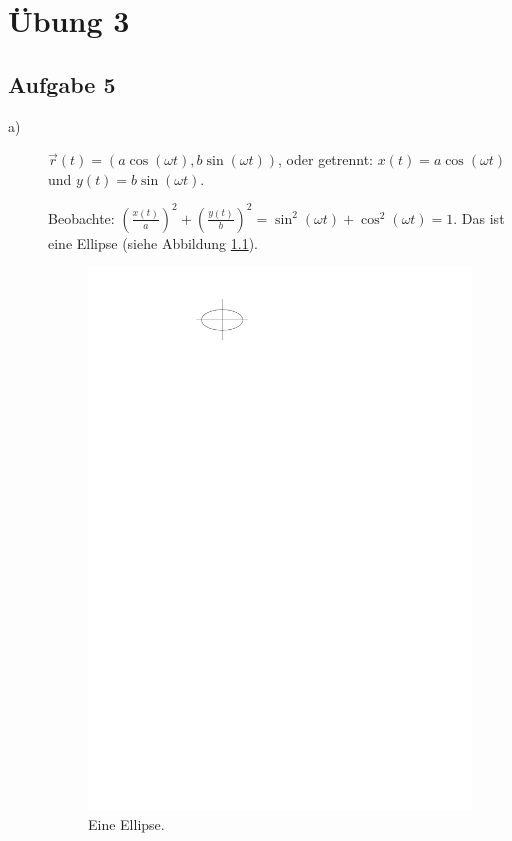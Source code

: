 \chapter{Übung 3}

\section*{Aufgabe 5}

\begin{description}
	\item[a)] $\vec{r}(t) = (a \cos(\omega t), b \sin(\omega t))$, oder getrennt: $x(t) = a \cos(\omega t)$ und $y(t) = b \sin(\omega t)$.

Beobachte: $\left( \frac{x(t)}{a} \right)^2 + \left( \frac{y(t)}{b} \right)^2 = \sin^2(\omega t) + \cos^2(\omega t) = 1$. Das ist eine Ellipse (siehe Abbildung \ref{fig:ueb3_aufgabe5a}).

	\begin{figure}[h]
		\centering
		\includegraphics{figures/ueb3/aufgabe5a}
		\caption{Eine Ellipse.}
		\label{fig:ueb3_aufgabe5a}
	\end{figure}


\end{description}
